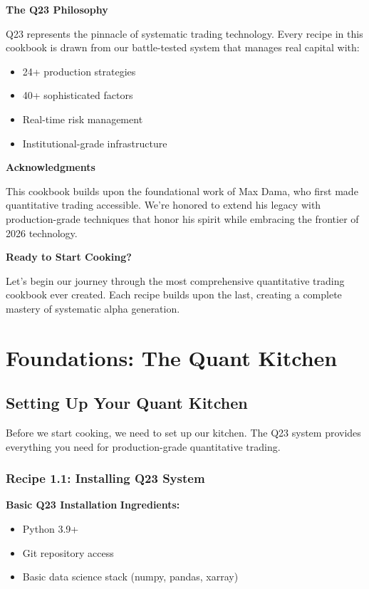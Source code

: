 \documentclass[11pt,letterpaper,openany]{book}
\begin{document}
\textbf{The Q23 Philosophy}

Q23 represents the pinnacle of systematic trading technology. Every recipe in this cookbook is drawn from our battle-tested system that manages real capital with:

\begin{itemize}
    \item 24+ production strategies
    \item 40+ sophisticated factors
    \item Real-time risk management
    \item Institutional-grade infrastructure
\end{itemize}

\textbf{Acknowledgments}

This cookbook builds upon the foundational work of Max Dama, who first made quantitative trading accessible. We're honored to extend his legacy with production-grade techniques that honor his spirit while embracing the frontier of 2026 technology.

\textbf{Ready to Start Cooking?}

Let's begin our journey through the most comprehensive quantitative trading cookbook ever created. Each recipe builds upon the last, creating a complete mastery of systematic alpha generation.

\chapter{Foundations: The Quant Kitchen}

\section{Setting Up Your Quant Kitchen}

Before we start cooking, we need to set up our kitchen. The Q23 system provides everything you need for production-grade quantitative trading.

\subsection{Recipe 1.1: Installing Q23 System}

\textbf{Basic Q23 Installation}
\textbf{Ingredients:}
\begin{itemize}
    \item Python 3.9+
    \item Git repository access
    \item Basic data science stack (numpy, pandas, xarray)
\end{itemize}
\end{document}

